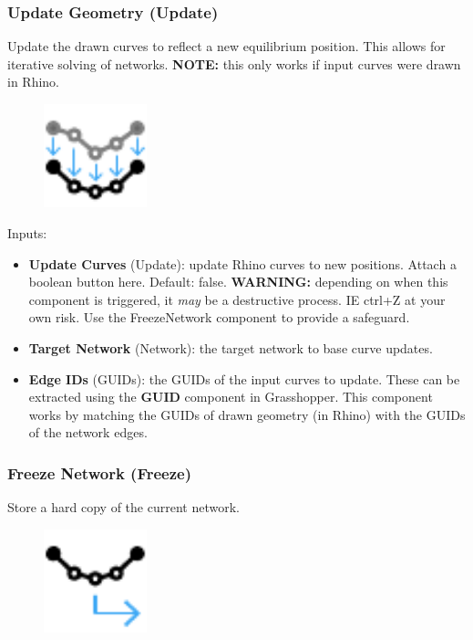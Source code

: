 \subsubsection{Update Geometry (Update)}
Update the drawn curves to reflect a new equilibrium position. This allows for iterative solving of networks. {\color{kpink} \textbf{NOTE:} this only works if input curves were drawn in Rhino}.

\begin{figure}[h]
    \centering
    \includegraphics[width=3cm]{Figures/update}
\end{figure}

Inputs:
\begin{itemize}
    \setlength\itemsep{0.05em}
    \item \textbf{Update Curves} (Update): update Rhino curves to new positions. Attach a boolean button here. {\color{gray}Default: false}. {\color{kpink}\textbf{WARNING:} depending on when this component is triggered, it \textit{may} be a destructive process. IE ctrl+Z at your own risk. Use the FreezeNetwork component to provide a safeguard.}
    \item \textbf{Target Network} (Network): the target network to base curve updates.
    \item \textbf{Edge IDs} (GUIDs): the GUIDs of the input curves to update. These can be extracted using the \textbf{GUID} component in Grasshopper. This component works by matching the GUIDs of drawn geometry (in Rhino) with the GUIDs of the network edges.
\end{itemize}

\subsubsection{Freeze Network (Freeze)}\label{Freeze}
Store a hard copy of the current network.

\begin{figure}[h]
    \centering
    \includegraphics[width=3cm]{Figures/export}
\end{figure}

